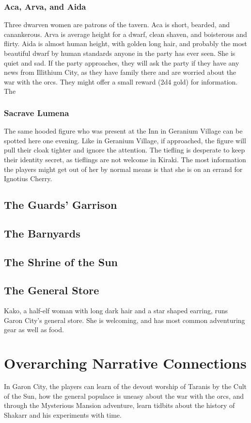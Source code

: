 \subsubsection{Aca, Arva, and Aida}
Three dwarven women are patrons of the tavern. Aca is short, bearded, and canankerous. Arva is average height for a dwarf, clean shaven, and boisterous and flirty. Aida is almost human height, with golden long hair, and probably the most beautiful dwarf by human standards anyone in the party has ever seen. She is quiet and sad. If the party approaches, they will ask the party if they have any news from Illithium City, as they have family there and are worried about the war with the orcs. They might offer a small reward (2d4 gold) for information. The
\subsubsection{Sacrave Lumena} The same hooded figure who was present at the Inn in Geranium Village can be spotted here one evening. Like in Geranium Village, if approached, the figure will pull their cloak tighter and ignore the attention. The tiefling is desperate to keep their identity secret, as tieflings are not welcome in Kiraki. The most information the players might get out of her by normal means is that she is on an errand for Ignotius Cherry.
\subsection{The Guards' Garrison}
\subsection{The Barnyards}
\subsection{The Shrine of the Sun}
\subsection{The General Store}
Kako, a half-elf woman with long dark hair and a star shaped earring, runs Garon City's general store. She is welcoming, and has most common adventuring gear as well as food.

\section{Overarching Narrative Connections}
In Garon City, the players can learn of the devout worship of Taranis by the Cult of the Sun, how the general populace is uneasy about the war with the orcs, and through the Mysterious Mansion adventure, learn tidbits about the history of Shakarr and his experiments with time.

